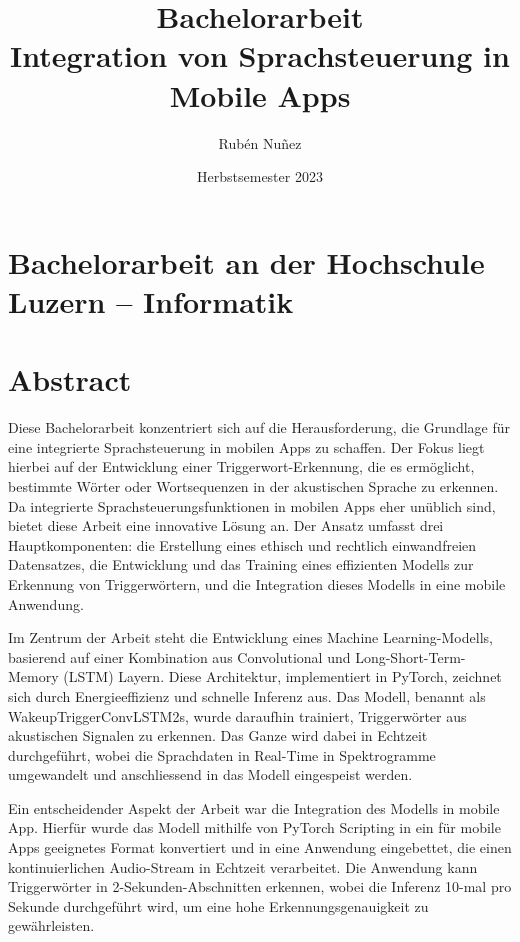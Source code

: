 \documentclass[11pt,a4paper]{article}
\title{
	{\LARGE Bachelorarbeit}\\[2em] 
	{\textbf{Integration von Sprachsteuerung {\break} in Mobile Apps}}
}
\author{Rubén Nuñez}
\date{Herbstsemester 2023}
\begin{document}
\maketitle
\thispagestyle{empty} %
\newpage

\section*{Bachelorarbeit an der Hochschule Luzern -- Informatik}

\newpage

\newpage \section*{Abstract}
Diese Bachelorarbeit konzentriert sich auf die Herausforderung, die Grundlage für eine integrierte 
Sprachsteuerung in mobilen Apps zu schaffen. Der Fokus liegt hierbei auf der Entwicklung einer 
Triggerwort-Erkennung, die es ermöglicht, bestimmte Wörter oder Wortsequenzen in der akustischen 
Sprache zu erkennen. Da integrierte Sprachsteuerungsfunktionen in mobilen Apps eher unüblich sind, 
bietet diese Arbeit eine innovative Lösung an. Der Ansatz umfasst drei Hauptkomponenten: die 
Erstellung eines ethisch und rechtlich einwandfreien Datensatzes, die Entwicklung und das Training 
eines effizienten Modells zur Erkennung von Triggerwörtern, und die Integration dieses Modells in 
eine mobile Anwendung.

\noindent \newline
Im Zentrum der Arbeit steht die Entwicklung eines Machine Learning-Modells, basierend auf einer 
Kombination aus Convolutional und Long-Short-Term-Memory (LSTM) Layern. Diese Architektur, 
implementiert in PyTorch, zeichnet sich durch Energieeffizienz und schnelle Inferenz aus. Das 
Modell, benannt als WakeupTriggerConvLSTM2s, wurde daraufhin trainiert, Triggerwörter aus 
akustischen Signalen zu erkennen. Das Ganze wird dabei in Echtzeit durchgeführt, wobei die 
Sprachdaten in Real-Time in Spektrogramme umgewandelt und anschliessend in das Modell eingespeist 
werden.

\noindent \newline
Ein entscheidender Aspekt der Arbeit war die Integration des Modells in mobile App. Hierfür wurde 
das Modell mithilfe von PyTorch Scripting in ein für mobile Apps geeignetes Format konvertiert und 
in eine Anwendung eingebettet, die einen kontinuierlichen Audio-Stream in Echtzeit verarbeitet. Die 
Anwendung kann Triggerwörter in 2-Sekunden-Abschnitten erkennen, wobei die Inferenz 10-mal pro 
Sekunde durchgeführt wird, um eine hohe Erkennungsgenauigkeit zu gewährleisten.
\end{document}
